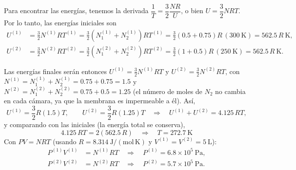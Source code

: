 \begin{solucion}
  Para encontrar las energías, tenemos la derivada $\dfrac{1}{T}=\dfrac{3}{2}\dfrac{NR}{U}$, o bien
  $U=\dfrac{3}{2}NRT$. Por lo tanto, las energías iniciales son
  \begin{align*}
    U^{(1)}&=\frac{3}{2}N^{(1)}RT^{(1)}=\frac{3}{2}\left(N_1^{(1)}+N_2^{(1)}\right)RT^{(1)}=\frac{3}{2}(0.5+0.75)R\,(300\ \mathrm{K})=562.5\,R\ \mathrm{K},\\
    U^{(2)}&=\frac{3}{2}N^{(2)}RT^{(2)}=\frac{3}{2}\left(N_1^{(2)}+N_2^{(2)}\right)RT^{(2)}=\frac{3}{2}(1+0.5)R\,(250\ \mathrm{K})=562.5\,R\ \mathrm{K}.
  \end{align*}

  Las energías finales serán entonces $U^{(1)}=\frac{3}{2}N^{(1)}RT$ y $U^{(2)}=\frac{3}{2}N^{(2)}RT$, con
  $N^{(1)}=N_1^{(1)}+N_2^{(1)}=0.75+0.75=1.5$ y $N^{(2)}=N_1^{(2)}+N_2^{(2)}=0.75+0.5=1.25$ (el
  número de moles de $N_2$ no cambia en cada cámara, ya que la membrana es impermeable a él). Así,
  \begin{equation*}
    U^{(1)}=\frac{3}{2}R(1.5)T,\qquad U^{(2)}=\frac{3}{2}R(1.25)T
    \quad\Longrightarrow\quad
    U^{(1)}+U^{(2)}=4.125\,RT,
  \end{equation*}
  y comparando con las iniciales (la energía total se conserva),
  \begin{equation*}
    4.125\,RT=2(562.5\,R)\quad\Longrightarrow\quad\boxed{T=272.7\ \mathrm{K}}
  \end{equation*}
  Con $PV=NRT$ (usando $R=8.314\ \mathrm{J/(mol\,K)}$ y $V^{(1)}=V^{(2)}=5\ \mathrm{L}$):
  \begin{align*}
    P^{(1)}V^{(1)}&=N^{(1)}RT\quad\Longrightarrow\quad\boxed{P^{(1)}=6.8\times10^{5}\ \mathrm{Pa}},\\
    P^{(2)}V^{(2)}&=N^{(2)}RT\quad\Longrightarrow\quad\boxed{P^{(2)}=5.7\times10^{5}\ \mathrm{Pa}}.
  \end{align*}
\end{solucion}

